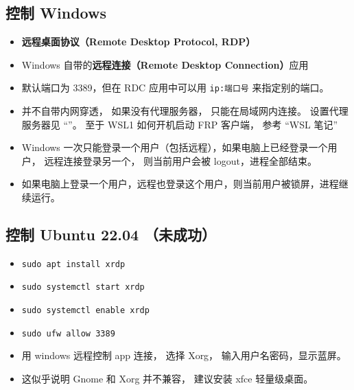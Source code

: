 
\begin{issues}
\issueDraft
\end{issues}

\subsection{控制 Windows}
\begin{itemize}
\item \textbf{远程桌面协议（Remote Desktop Protocol, RDP）}
\item Windows 自带的\textbf{远程连接（Remote Desktop Connection）}应用
\item 默认端口为 3389，但在 RDC 应用中可以用 \verb|ip:端口号| 来指定别的端口。
\item 并不自带内网穿透， 如果没有代理服务器， 只能在局域网内连接。 设置代理服务器见 “”。 至于 WSL1 如何开机启动 FRP 客户端， 参考 “WSL 笔记”
\item Windows 一次只能登录一个用户（包括远程），如果电脑上已经登录一个用户， 远程连接登录另一个， 则当前用户会被 logout，进程全部结束。
\item 如果电脑上登录一个用户，远程也登录这个用户，则当前用户被锁屏，进程继续运行。
\end{itemize}

\subsection{控制 Ubuntu 22.04 （未成功）}
\begin{itemize}
\item \verb|sudo apt install xrdp|
\item \verb|sudo systemctl start xrdp|
\item \verb|sudo systemctl enable xrdp|
\item \verb|sudo ufw allow 3389|
\item 用 windows 远程控制 app 连接， 选择 Xorg， 输入用户名密码，显示蓝屏。
\item 这似乎说明 Gnome 和 Xorg 并不兼容， 建议安装 xfce 轻量级桌面。
\end{itemize}
